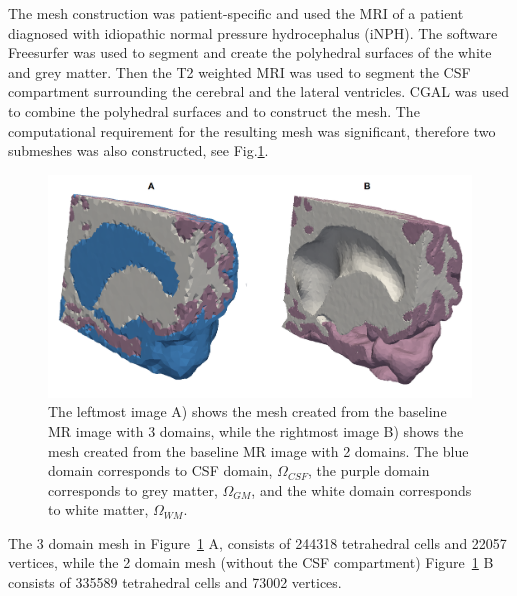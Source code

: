 \documentclass[11pt,a4paper]{article}
\newcommand{\lars}[1]{\textcolor{magenta}{#1}}
\begin{document}
The mesh construction was patient-specific and used the MRI of a patient diagnosed with idiopathic normal pressure hydrocephalus (iNPH). The software Freesurfer was used to segment and create the polyhedral surfaces of the white and grey matter. Then the T2 weighted MRI \cite{eidevalnes} was used to segment the CSF compartment surrounding the cerebral and the lateral ventricles. CGAL \cite{cgal:rty-m3-18b} was used to combine the polyhedral surfaces and to construct the mesh. The computational requirement for the resulting mesh was significant, therefore two submeshes was also constructed, see Fig.\ref{Fig::Mesh}.
\begin{figure}
\centering
\includegraphics[scale=0.2]{mesh.png} 
\caption{The leftmost image A) shows the mesh created from the baseline MR image with 3 domains, while the rightmost image  B) shows the mesh created from the baseline MR image with 2 domains. The blue domain corresponds to CSF domain, $\Omega_{CSF}$, the purple domain corresponds to grey matter,  $\Omega_{GM}$, and the white domain corresponds to white matter, $\Omega_{WM}$. }
\label{Fig::Mesh}
\end{figure}
The 3 domain mesh in Figure~\ref{Fig::Mesh} A, consists of 244318 tetrahedral cells and 22057 vertices, while the 2 domain mesh (without the CSF compartment) Figure~\ref{Fig::Mesh} B consists of 335589 tetrahedral cells and 73002 vertices. 
\end{document}
